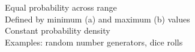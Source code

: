 \documentclass[preview]{standalone}
\begin{document}
Equal probability across range\\Defined by minimum (a) and maximum (b) values\\Constant probability density\\Examples: random number generators, dice rolls\\
\end{document}
